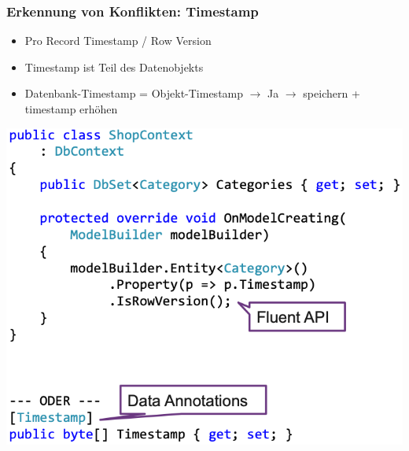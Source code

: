 \subsubsection{Erkennung von Konflikten: Timestamp}
\begin{itemize}
    \item Pro Record Timestamp / Row Version
    \item Timestamp ist Teil des Datenobjekts
    \item Datenbank-Timestamp = Objekt-Timestamp $\rightarrow$ Ja $\rightarrow$ speichern + timestamp erhöhen
\end{itemize}
\vspace{-8pt}
\begin{center}
    \includegraphics[scale=.38]{graphic/efc/timestamp.png}
\end{center}
\vspace{-8pt}

